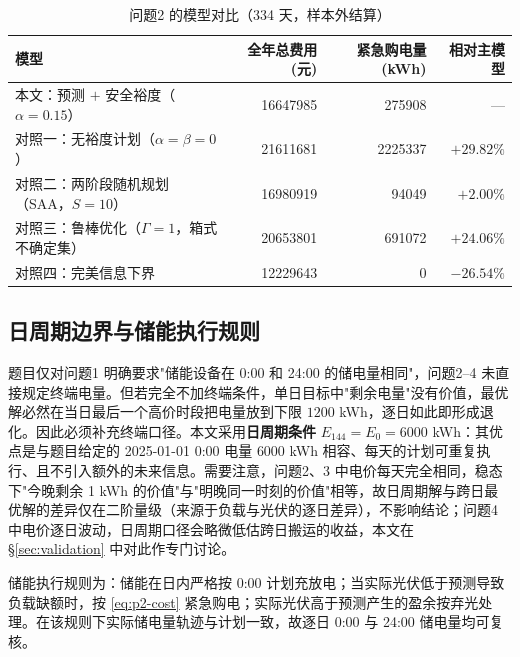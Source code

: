 \begin{table}[H]
  \centering
  \caption{问题2 的模型对比（334 天，样本外结算）}
  \label{tab:p2-models}
  \footnotesize
  \begin{tabular}{p{4.6cm}rrr}
    \toprule[1.5pt]
    模型 & 全年总费用 (元) & 紧急购电量 (\si{kWh}) & 相对主模型 \\
    \midrule[1pt]
    本文：预测 $+$ 安全裕度（$\alpha=0.15$） & 16647985 & 275908 & --- \\
    对照一：无裕度计划（$\alpha=\beta=0$） & 21611681 & 2225337 & $+29.82\%$ \\
    对照二：两阶段随机规划（SAA，$S=10$） & 16980919 & 94049 & $+2.00\%$ \\
    对照三：鲁棒优化（$\Gamma=1$，箱式不确定集） & 20653801 & 691072 & $+24.06\%$ \\
    对照四：完美信息下界 & 12229643 & 0 & $-26.54\%$ \\
    \bottomrule[1.5pt]
  \end{tabular}
  \par\vspace{3pt}{\footnotesize 注：对照二的情景取该日之前 10 天的实际负载与光伏曲线，第一段计划在样本外与实际数据结算；对照三按 $\hat L+\sigma_L$、$\hat P-\sigma_P$ 编制计划，$\sigma$ 取前 10 天同时段标准差。}
\end{table}

\subsection{日周期边界与储能执行规则}
\label{sec:boundary}

题目仅对问题1 明确要求"储能设备在 0:00 和 24:00 的储电量相同"，问题2--4 未直接规定终端电量。但若完全不加终端条件，单日目标中"剩余电量"没有价值，最优解必然在当日最后一个高价时段把电量放到下限 $1200$ \si{kWh}，逐日如此即形成退化。因此必须补充终端口径。本文采用\textbf{日周期条件} $E_{144}=E_0=6000$ \si{kWh}：其优点是与题目给定的 2025-01-01 0:00 电量 $6000$ \si{kWh} 相容、每天的计划可重复执行、且不引入额外的未来信息。需要注意，问题2、3 中电价每天完全相同，稳态下"今晚剩余 1 \si{kWh} 的价值"与"明晚同一时刻的价值"相等，故日周期解与跨日最优解的差异仅在二阶量级（来源于负载与光伏的逐日差异），不影响结论；问题4 中电价逐日波动，日周期口径会略微低估跨日搬运的收益，本文在 \S\ref{sec:validation} 中对此作专门讨论。

储能执行规则为：储能在日内严格按 0:00 计划充放电；当实际光伏低于预测导致负载缺额时，按 \cref{eq:p2-cost} 紧急购电；实际光伏高于预测产生的盈余按弃光处理。在该规则下实际储电量轨迹与计划一致，故逐日 0:00 与 24:00 储电量均可复核。

